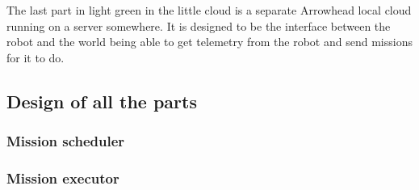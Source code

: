 \documentclass[main.tex]{subfiles}
\begin{document}
The last part in light green in the little cloud is a separate Arrowhead local cloud running on a server somewhere. It is designed to be the interface between the robot and the world being able to get telemetry from the robot and send missions for it to do.

\subsection{Design of all the parts}

\subsubsection{Mission scheduler}

\subsubsection{Mission executor}
\label{sec:mission_executor}
\end{document}
